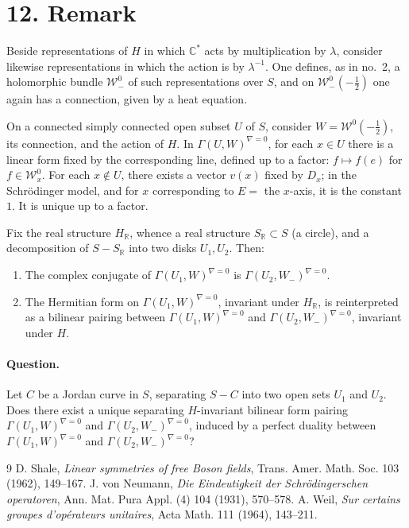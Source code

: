 \documentclass[11pt]{article}
\newcommand{\C}{\mathbb C}
\newcommand{\R}{\mathbb R}
\newcommand{\cW}{\mathcal W}
\newcommand{\half}{\tfrac12}
\begin{document}
\section*{12. Remark}
Beside representations of $H$ in which $\C^*$ acts by multiplication by $\lambda$, consider likewise representations in which the action is by $\lambda^{-1}$. One defines, as in no.~2, a holomorphic bundle $\cW_-^0$ of such representations over $S$, and on $\cW_-^0(-\half)$ one again has a connection, given by a heat equation.

On a connected simply connected open subset $U$ of $S$, consider $W=\cW^0(-\half)$, its connection, and the action of $H$. In $\Gamma(U,W)^{\nabla=0}$, for each $x\in U$ there is a linear form fixed by the corresponding line, defined up to a factor: $f\mapsto f(e)$ for $f\in \cW_x^0$. For each $x\notin U$, there exists a vector $v(x)$ fixed by $D_x$; in the Schr\"odinger model, and for $x$ corresponding to $E=$ the $x$-axis, it is the constant $1$. It is unique up to a factor.

Fix the real structure $H_\R$, whence a real structure $S_\R\subset S$ (a circle), and a decomposition of $S-S_\R$ into two disks $U_1,U_2$. Then:
\begin{enumerate}[label=(\alph*)]
\item The complex conjugate of $\Gamma(U_1,W)^{\nabla=0}$ is $\Gamma(U_2,W_-)^{\nabla=0}$.
\item The Hermitian form on $\Gamma(U_1,W)^{\nabla=0}$, invariant under $H_\R$, is reinterpreted as a bilinear pairing between $\Gamma(U_1,W)^{\nabla=0}$ and $\Gamma(U_2,W_-)^{\nabla=0}$, invariant under $H$.
\end{enumerate}

\paragraph{Question.} Let $C$ be a Jordan curve in $S$, separating $S-C$ into two open sets $U_1$ and $U_2$. Does there exist a unique separating $H$-invariant bilinear form pairing $\Gamma(U_1,W)^{\nabla=0}$ and $\Gamma(U_2,W_-)^{\nabla=0}$, induced by a perfect duality between $\Gamma(U_1,W)^{\nabla=0}$ and $\Gamma(U_2,W_-)^{\nabla=0}$?

\begin{thebibliography}{9}
 D. Shale, \emph{Linear symmetries of free Boson fields}, Trans. Amer. Math. Soc. 103 (1962), 149--167.
 J. von Neumann, \emph{Die Eindeutigkeit der Schr\"odingerschen operatoren}, Ann. Mat. Pura Appl. (4) 104 (1931), 570--578.
 A. Weil, \emph{Sur certains groupes d'op\'erateurs unitaires}, Acta Math. 111 (1964), 143--211.
\end{thebibliography}
\end{document}
